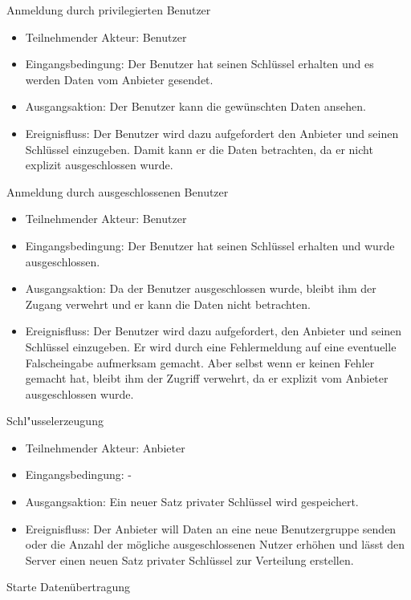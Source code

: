 \documentclass[a4paper,10pt]{scrartcl}
\begin{document}
\begin{usecase}
 {Anmeldung durch privilegierten Benutzer
   \begin{itemize}
   \item Teilnehmender Akteur: Benutzer
   \item Eingangsbedingung: Der Benutzer hat seinen Schlüssel erhalten und es werden Daten vom Anbieter
                            gesendet.
   \item Ausgangsaktion: Der Benutzer kann die gewünschten Daten ansehen.
   \item Ereignisfluss: Der Benutzer wird dazu aufgefordert den Anbieter und seinen Schlüssel
         einzugeben. Damit kann er die Daten betrachten, da er nicht explizit ausgeschlossen wurde.
   \end{itemize}
}
 {Anmeldung durch ausgeschlossenen Benutzer
   \begin{itemize}
   \item Teilnehmender Akteur: Benutzer
   \item Eingangsbedingung: Der Benutzer hat seinen Schlüssel erhalten und wurde ausgeschlossen.
   \item Ausgangsaktion:  Da der Benutzer ausgeschlossen wurde, bleibt ihm der Zugang verwehrt und er kann
             die Daten nicht betrachten.
   \item Ereignisfluss: Der Benutzer wird dazu aufgefordert, den Anbieter und seinen Schlüssel
         einzugeben. Er wird durch eine Fehlermeldung auf eine eventuelle Falscheingabe aufmerksam gemacht. Aber selbst wenn er keinen
         Fehler gemacht hat, bleibt ihm der Zugriff verwehrt, da er explizit vom Anbieter ausgeschlossen wurde.
   \end{itemize}
}
 {Schl"usselerzeugung
   \begin{itemize}
   \item Teilnehmender Akteur: Anbieter
   \item Eingangsbedingung: -
   \item Ausgangsaktion: Ein neuer Satz privater Schlüssel wird gespeichert.
   \item Ereignisfluss: Der Anbieter will Daten an eine neue Benutzergruppe senden oder die Anzahl der
         mögliche ausgeschlossenen Nutzer erhöhen und lässt
         den Server einen neuen Satz privater Schlüssel zur Verteilung erstellen.
   \end{itemize}
}
 {Starte Datenübertragung
   \begin{itemize}

\end{itemize}}
\end{usecase}
\end{document}
